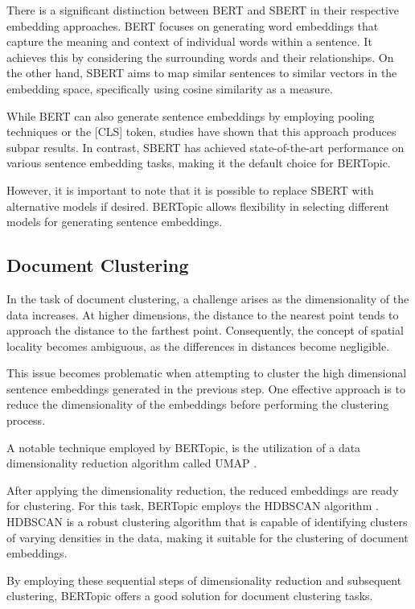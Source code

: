 \documentclass[12pt,oneside,bibtotoc,liststotoc]{scrbook}
\begin{document}
There is a significant distinction between BERT and SBERT in their respective embedding approaches. BERT focuses on generating word embeddings that capture the meaning and context of individual words within a sentence. It achieves this by considering the surrounding words and their relationships. \cite{bert} On the other hand, SBERT aims to map similar sentences to similar vectors in the embedding space, specifically using cosine similarity as a measure. \cite{sbert}

While BERT can also generate sentence embeddings by employing pooling techniques or the [CLS] token, studies \cite{sbert} have shown that this approach produces subpar results. In contrast, SBERT has achieved state-of-the-art performance on various sentence embedding tasks, making it the default choice for BERTopic.

However, it is important to note that it is possible to replace SBERT with alternative models if desired. BERTopic allows flexibility in selecting different models for generating sentence embeddings. \cite{bertopic}

\subsection{Document Clustering}
In the task of document clustering, a challenge arises as the dimensionality of the data increases. At higher dimensions, the distance to the nearest point tends to approach the distance to the farthest point. Consequently, the concept of spatial locality becomes ambiguous, as the differences in distances become negligible.

This issue becomes problematic when attempting to cluster the high dimensional sentence embeddings generated in the previous step. One effective approach is to reduce the dimensionality of the embeddings before performing the clustering process.

A notable technique employed by BERTopic, is the utilization of a data dimensionality reduction algorithm called UMAP \cite{umap}.

After applying the dimensionality reduction, the reduced embeddings are ready for clustering. For this task, BERTopic employs the HDBSCAN algorithm \cite{hdbscan}. HDBSCAN is a robust clustering algorithm that is capable of identifying clusters of varying densities in the data, making it suitable for the clustering of document embeddings.

By employing these sequential steps of dimensionality reduction and subsequent clustering, BERTopic offers a good solution for document clustering tasks. \cite{bertopic}
\end{document}
